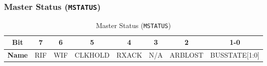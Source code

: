   \subsubsection{Master Status (\texttt{MSTATUS})}
  \label{sec:mstatus}
  
  \begin{table}[H]
      \centering
      \caption{Master Status (\texttt{MSTATUS})}
      \begin{tabular}{@{}cccccccc@{}}
          \toprule
          \textbf{Bit} & 7 & 6 & 5 & 4 & 3 & 2 & 1-0 \\ \midrule
          \textbf{Name} & RIF & WIF & CLKHOLD & RXACK & N/A & ARBLOST & BUSSTATE[1:0] \\ \bottomrule
      \end{tabular}
      \label{tab:mstatus}
  \end{table}
  
